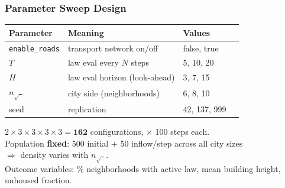 \documentclass{beamer}
\begin{document}
\begin{frame}
  \frametitle{Parameter Sweep Design}
  \begin{center}
  \renewcommand{\arraystretch}{1.3}
  \begin{tabular}{llll}
    \toprule
    \textcolor{nimbygray}{Parameter} & \textcolor{nimbygray}{Meaning} & \textcolor{nimbygray}{Values} \\
    \midrule
    \texttt{enable\_roads} & transport network on/off & false, true \\
    $T$ & law eval every $N$ steps & 5, 10, 20 \\
    $H$ & law eval horizon (look-ahead) & 3, 7, 15 \\
    $n_{\sqrt{\phantom{x}}}$ & city side (neighborhoods) & 6, 8, 10 \\
    seed & replication & 42, 137, 999 \\
    \bottomrule
  \end{tabular}
  \end{center}
  \vspace{0.4em}
  $2 \times 3 \times 3 \times 3 \times 3 = \mathbf{162}$ configurations,
  $\times$ 100 steps each.\\[0.3em]
  Population \textbf{fixed}: 500 initial $+$ 50 inflow/step across all city sizes\\
  $\Rightarrow$ density varies with $n_{\sqrt{\phantom{x}}}$.\\[0.4em]
  \small Outcome variables: \% neighborhoods with active law, mean building height, unhoused fraction.
\end{frame}
\end{document}
